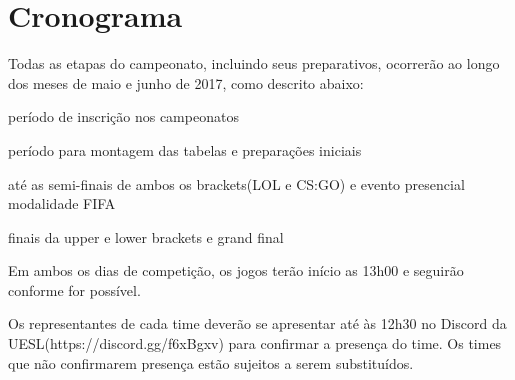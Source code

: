 \section{Cronograma}

Todas as etapas do campeonato, incluindo seus preparativos, ocorrerão ao longo dos meses de maio e junho de 2017, como descrito abaixo:

\begin{description}[leftmargin=!,labelwidth=\widthof{\bfseries 25/05 a 08/05},labelindent=1.5em]
	\item[Até 08/11] período de inscrição nos campeonatos
	\item[10/11] período para montagem das tabelas e preparações iniciais
	\item[11/11] até as semi-finais de ambos os brackets(LOL e CS:GO) e evento presencial modalidade FIFA
	\item[11/06] finais da upper e lower brackets e grand final
\end{description}

Em ambos os dias de competição, os jogos terão início as 13h00 e seguirão conforme for possível.

Os representantes de cada time deverão se apresentar até às 12h30 no Discord da UESL(https://discord.gg/f6xBgxv) para confirmar a presença do time. Os times que não confirmarem presença estão sujeitos a serem substituídos.